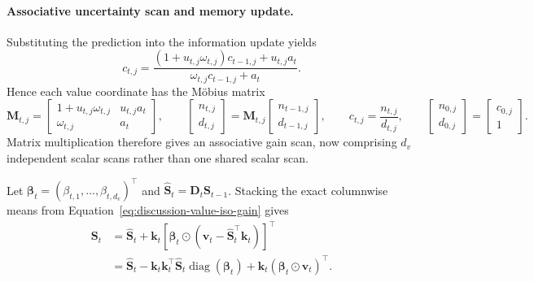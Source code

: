 \documentclass[11pt]{article}
\newcommand{\vct}[1]{\boldsymbol{#1}}
\newcommand{\diag}{\operatorname{diag}}
\begin{document}
\paragraph{Associative uncertainty scan and memory update.}
Substituting the prediction into the information update yields
\begin{equation}
  c_{t,j}
  =\frac{(1+u_{t,j}\omega_{t,j})c_{t-1,j}+u_{t,j}a_t}
    {\omega_{t,j}c_{t-1,j}+a_t}.
  \label{eq:discussion-value-iso-mobius}
\end{equation}
Hence each value coordinate has the M\"obius matrix
\begin{equation}
  \vct{M}_{t,j}
  =\begin{bmatrix}
    1+u_{t,j}\omega_{t,j} & u_{t,j}a_t \\
    \omega_{t,j} & a_t
  \end{bmatrix},
  \qquad
  \begin{bmatrix}n_{t,j}\\d_{t,j}\end{bmatrix}
  =\vct{M}_{t,j}
   \begin{bmatrix}n_{t-1,j}\\d_{t-1,j}\end{bmatrix},
  \qquad
  c_{t,j}=\frac{n_{t,j}}{d_{t,j}},
  \qquad
  \begin{bmatrix}n_{0,j}\\d_{0,j}\end{bmatrix}
  =\begin{bmatrix}c_{0,j}\\1\end{bmatrix}.
  \label{eq:discussion-value-iso-mobius-matrix}
\end{equation}
Matrix multiplication therefore gives an associative gain scan, now comprising $d_v$ independent
scalar scans rather than one shared scalar scan.

Let $\vct{\beta}_t=(\beta_{t,1},\ldots,\beta_{t,d_v})^\top$ and
$\widehat{\vct{S}}_t=\vct{D}_t\vct{S}_{t-1}$. Stacking the exact columnwise means from
Equation~\eqref{eq:discussion-value-iso-gain} gives
\begin{equation}
\begin{aligned}
  \vct{S}_t
  &=\widehat{\vct{S}}_t
    +\vct{k}_t
      \left[
        \vct{\beta}_t\odot
        \left(\vct{v}_t-\widehat{\vct{S}}_t^\top\vct{k}_t\right)
      \right]^\top
  \\
  &=\widehat{\vct{S}}_t
    -\vct{k}_t\vct{k}_t^\top\widehat{\vct{S}}_t\diag(\vct{\beta}_t)
    +\vct{k}_t(\vct{\beta}_t\odot\vct{v}_t)^\top.
\end{aligned}
  \label{eq:discussion-value-iso-memory-update}
\end{equation}
\end{document}
